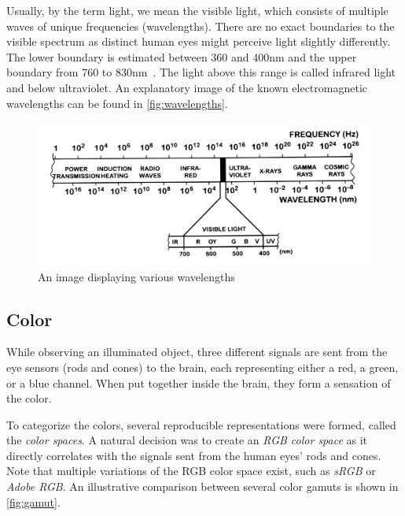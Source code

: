 Usually, by the term light, we mean the visible light, which consists of multiple waves of unique frequencies (wavelengths). There are no exact boundaries to the visible spectrum as distinct human eyes might perceive light slightly differently. The lower boundary is estimated between 360 and 400nm and the upper boundary from 760 to 830nm~\cite{sliney2016light}. The light above this range is called infrared light and below ultraviolet. An explanatory image of the known electromagnetic wavelengths can be found in \autoref{fig:wavelengths}.

\begin{figure}[h]
	\centering
	\includegraphics[width=0.8\linewidth]{img/wavelengths.png}
	\caption{An image displaying various wavelengths~\cite{colorScienceSlides}}
	\label{fig:wavelengths}
\end{figure}

\subsection{Color}

While observing an illuminated object, three different signals are sent from the eye sensors (rods and cones) to the brain, each representing either a red, a green, or a blue channel. When put together inside the brain, they form a sensation of the color. 

To categorize the colors, several reproducible representations were formed, called the \emph{color spaces}. A natural decision was to create an \emph{RGB color space} as it directly correlates with the signals sent from the human eyes' rods and cones. Note that multiple variations of the RGB color space exist, such as \emph{sRGB} or \emph{Adobe RGB}. An illustrative comparison between several color gamuts is shown in \autoref{fig:gamut}.

